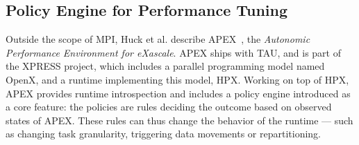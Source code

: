 \subsection{Policy Engine for Performance Tuning}

Outside the scope of MPI, Huck et al. describe APEX~\cite{Huck:2013:EPA:2491661.2481434}, the \textit{Autonomic Performance Environment for eXascale}.
APEX ships with TAU, and is part of the XPRESS project, which includes a parallel programming model named OpenX, and a runtime implementing this model, HPX.
Working on top of HPX, APEX provides runtime introspection and includes a policy engine introduced as a core feature: the policies are rules deciding the outcome based on observed states of APEX.
These rules can thus change the behavior of the runtime --- such as changing task granularity, triggering data movements or repartitioning.
